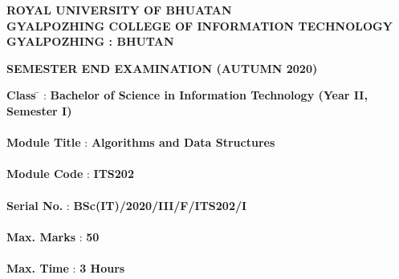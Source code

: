 \documentclass[12pt ,a4paper]{exam}
\author{Yonten Jamtsho}
\begin{document}
	\begin{center}
		\textbf{ROYAL UNIVERSITY OF BHUATAN} \\
		\textbf{GYALPOZHING COLLEGE OF INFORMATION TECHNOLOGY} \\
		\textbf{GYALPOZHING : BHUTAN}
	\end{center}
	
	\vspace{0.2cm}
	
	\begin{center}
		\textbf{SEMESTER END EXAMINATION (AUTUMN 2020)}
	\end{center}
	
	\vspace{0.1cm}
	
	\begin{tabbing}
		\textbf{Class} \=  \hspace{2cm} :  \hspace{0.3cm} \textbf{Bachelor of Science in Information Technology (Year II, Semester I)}     \\ \\
		
		\textbf{Module Title} \hspace{0.65cm} : \hspace{0.3cm} \textbf{Algorithms and Data Structures}       \\ \\
		
		\textbf{Module Code} \hspace{0.55cm} :     \hspace{0.3cm} \textbf{ITS202}     \\ \\
		
		\textbf{Serial No.} \hspace{1.13cm} :       \hspace{0.3cm} \textbf{BSc(IT)/2020/III/F/ITS202/I}          \\ \\
		
		\textbf{Max. Marks} \hspace{0.75cm} :     \hspace{0.3cm} \textbf{50}             \\ \\
		
		\textbf{Max. Time} \hspace{1.04cm} :        \hspace{0.3cm} \textbf{3 Hours}             \\ \\
	\end{tabbing}
	
\end{document}
